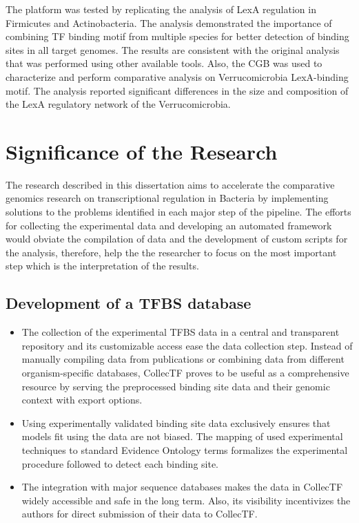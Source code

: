 \documentclass[12pt]{article}
\begin{document}
The platform was tested by replicating the analysis of LexA regulation in
Firmicutes and Actinobacteria. The analysis demonstrated the importance of
combining TF binding motif from multiple species for better detection of
binding sites in all target genomes. The results are consistent with the
original analysis that was performed using other available tools. Also, the CGB
was used to characterize and perform comparative analysis on Verrucomicrobia
LexA-binding motif. The analysis reported significant differences in the size
and composition of the LexA regulatory network of the Verrucomicrobia.

\section{Significance of the Research}

The research described in this dissertation aims to accelerate the comparative
genomics research on transcriptional regulation in Bacteria by implementing
solutions to the problems identified in each major step of the pipeline. The
efforts for collecting the experimental data and developing an automated
framework would obviate the compilation of data and the development of custom
scripts for the analysis, therefore, help the the researcher to focus on the
most important step which is the interpretation of the results.

\subsection{Development of a TFBS database}

\begin{itemize}
\item The collection of the experimental TFBS data in a central and transparent
  repository and its customizable access ease the data collection step. Instead
  of manually compiling data from publications or combining data from different
  organism-specific databases, CollecTF proves to be useful as a comprehensive
  resource  by serving the preprocessed binding site data and their
  genomic context with export options.

\item Using experimentally validated binding site data exclusively ensures that
  models fit using the data are not biased. The mapping of used experimental
  techniques to standard Evidence Ontology terms formalizes the experimental
  procedure followed to detect each binding site.

\item The integration with major sequence databases makes the data in CollecTF
  widely accessible and safe in the long term. Also, its visibility
  incentivizes the authors for direct submission of their data to CollecTF.
\end{itemize}
\end{document}
